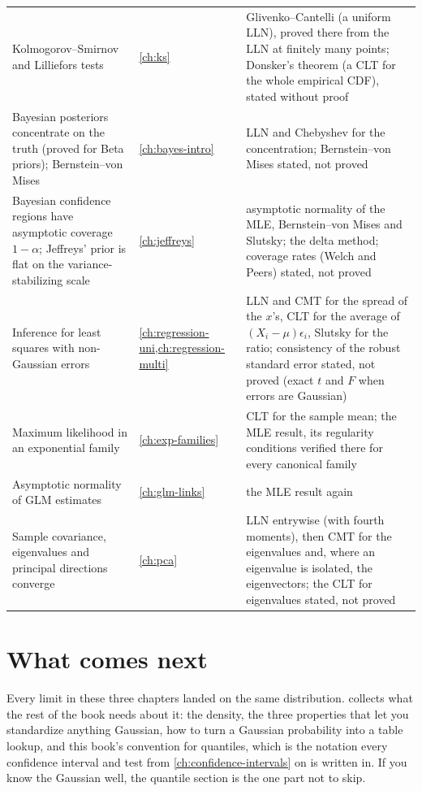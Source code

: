 \begin{small}
\begin{longtable}{@{}>{\raggedright\arraybackslash}p{2.55in}>{\raggedright\arraybackslash}p{0.9in}>{\raggedright\arraybackslash}p{2.45in}@{}}
Kolmogorov--Smirnov and Lilliefors tests & \cref{ch:ks} & Glivenko--Cantelli (a uniform LLN), proved there from the LLN at finitely many points; Donsker's theorem (a CLT for the whole empirical CDF), stated without proof \\[3pt]
Bayesian posteriors concentrate on the truth (proved for Beta priors); Bernstein--von Mises & \cref{ch:bayes-intro} & LLN and Chebyshev for the concentration; Bernstein--von Mises stated, not proved \\[3pt]
Bayesian confidence regions have asymptotic coverage $1 - \alpha$; Jeffreys' prior is flat on the variance-stabilizing scale & \cref{ch:jeffreys} & asymptotic normality of the MLE, Bernstein--von Mises and Slutsky; the delta method; coverage rates (Welch and Peers) stated, not proved \\[3pt]
Inference for least squares with non-Gaussian errors & \cref{ch:regression-uni,ch:regression-multi} & LLN and CMT for the spread of the $x$'s, CLT for the average of $(X_i - \mu)\epsilon_i$, Slutsky for the ratio; consistency of the robust standard error stated, not proved (exact $t$ and $F$ when errors are Gaussian) \\[3pt]
Maximum likelihood in an exponential family & \cref{ch:exp-families} & CLT for the sample mean; the MLE result, its regularity conditions verified there for every canonical family \\[3pt]
Asymptotic normality of GLM estimates & \cref{ch:glm-links} & the MLE result again \\[3pt]
Sample covariance, eigenvalues and principal directions converge & \cref{ch:pca} & LLN entrywise (with fourth moments), then CMT for the eigenvalues and, where an eigenvalue is isolated, the eigenvectors; the CLT for eigenvalues stated, not proved \\
\end{longtable}
\end{small}

\section{What comes next}
\label{sec:tools-next}

Every limit in these three chapters landed on the same distribution.
 collects what the rest of the book needs about it: the density, the three properties that let you standardize anything Gaussian, how to turn a Gaussian probability into a table lookup, and this book's convention for quantiles, which is the notation every confidence interval and test from \cref{ch:confidence-intervals} on is written in.
If you know the Gaussian well, the quantile section is the one part not to skip.

